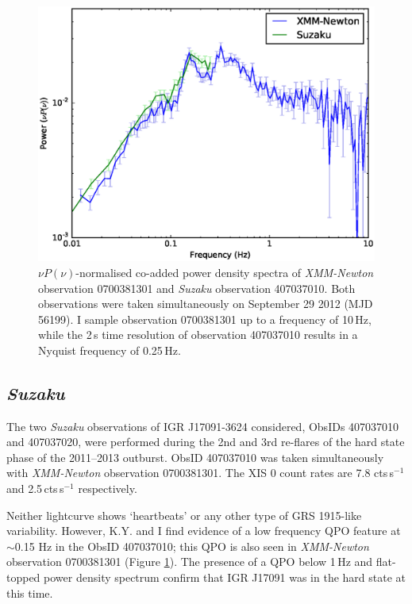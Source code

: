 \begin{figure}
    \includegraphics[width=0.9\columnwidth, trim = 0cm 0cm 0.5cm 1.0cm, clip]{images/multipower.eps}
    \captionsetup{singlelinecheck=off}
    \caption[$\nu P(\nu)$-normalised co-added power density spectra of \textit{XMM-Newton} observation 0700381301 and \textit{Suzaku} observation 407037010.]{$\nu P(\nu)$-normalised co-added power density spectra of \textit{XMM-Newton} observation 0700381301 and \textit{Suzaku} observation 407037010.  Both observations were taken simultaneously on September 29 2012 (MJD 56199).  I sample observation 0700381301 up to a frequency of 10\,Hz, while the 2\,s time resolution of observation 407037010 results in a Nyquist frequency of 0.25\,Hz.}
   \label{fig:xmmqpo}
\end{figure}

\subsection{\textit{Suzaku}}

\par The two {\it Suzaku} observations of IGR J17091-3624 considered, ObsIDs 407037010 and 407037020, were performed during the 2nd and 3rd re-flares of the hard state phase of the 2011--2013 outburst.  ObsID 407037010 was taken simultaneously with \textit{XMM-Newton} observation 0700381301.  The XIS 0 count rates are 7.8 cts\,s$^{-1}$ and 2.5\,cts\,s$^{-1}$ respectively.
\par Neither lightcurve shows `heartbeats' or any other type of GRS 1915-like variability.  However, \textsf{K.Y.} and I find evidence of a low frequency QPO feature at $\sim$0.15 Hz in the ObsID 407037010; this QPO is also seen in \textit{XMM-Newton} observation 0700381301 (Figure \ref{fig:xmmqpo}).  The presence of a QPO below 1\,Hz and flat-topped power density spectrum confirm that IGR J17091 was in the hard state at this time.

